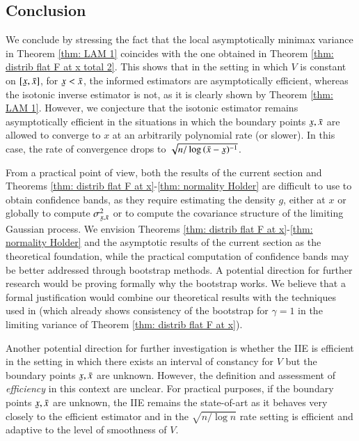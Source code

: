 \vspace{-1cm}
\subsection{Conclusion}
We conclude by stressing the fact that the local asymptotically minimax variance in Theorem \ref{thm: LAM 1} coincides with the one obtained in Theorem \ref{thm: distrib flat F at x total 2}. This shows that in the setting in which $V$ is constant on $[\ubar{x},\bar{x}]$, for $\ubar{x} < \bar{x}$, the informed estimators are asymptotically efficient, whereas the isotonic inverse estimator is not, as it is clearly shown by Theorem \ref{thm: LAM 1}. However, we conjecture that the isotonic estimator remains asymptotically efficient in the situations in which the boundary points $\ubar{x},\bar{x}$ are allowed to converge to $x$ at an arbitrarily polynomial rate (or slower). In this case, the rate of convergence drops to $\sqrt{n/\log{(\bar{x}-\ubar{x})^{-1}}}$. 

From a practical point of view, both the results of the current section and Theorems \ref{thm: distrib flat F at x}-\ref{thm: normality Holder} are difficult to use to obtain confidence bands, as they require estimating the density \( g \), either at $x$ or globally to compute $\sigma^2_{\ubar{x},\bar{x}}$ or to compute the covariance structure of the limiting Gaussian process. We envision Theorems \ref{thm: distrib flat F at x}-\ref{thm: normality Holder} and the asymptotic results of the current section as the theoretical foundation, while the practical computation of confidence bands may be better addressed through bootstrap methods. A potential direction for further research would be proving formally why the bootstrap works. We believe that a formal justification would combine our theoretical results with the techniques used in \cite{19} (which already shows consistency of the bootstrap for $\gamma =1$ in the limiting variance of Theorem \ref{thm: distrib flat F at x}). 

Another potential direction for further investigation is whether the IIE is efficient in the setting in which there exists an interval of constancy for $V$ but the boundary points $\ubar{x},\bar{x}$ are unknown. However, the definition and assessment of \textit{efficiency} in this context are unclear. For practical purposes, if the boundary points $\ubar{x},\bar{x}$ are unknown, the IIE remains the state-of-art as it behaves very closely to the efficient estimator and in the $\sqrt{n / \log{n}}$ rate setting is efficient and adaptive to the level of smoothness of $V$.


